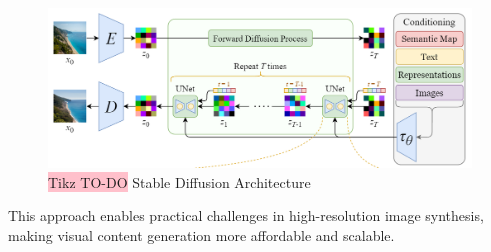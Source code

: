 \begin{figure}[!htbp]
    \centering
    \includegraphics[width=\linewidth]{tikz/chapter10 - Stable Diffusion Architecture.png}
    \caption{{\color{red}\colorbox{pink}{Tikz TO-DO}} Stable Diffusion Architecture}
\end{figure}

This approach enables practical challenges in high-resolution image synthesis, making visual content generation more affordable and scalable.
